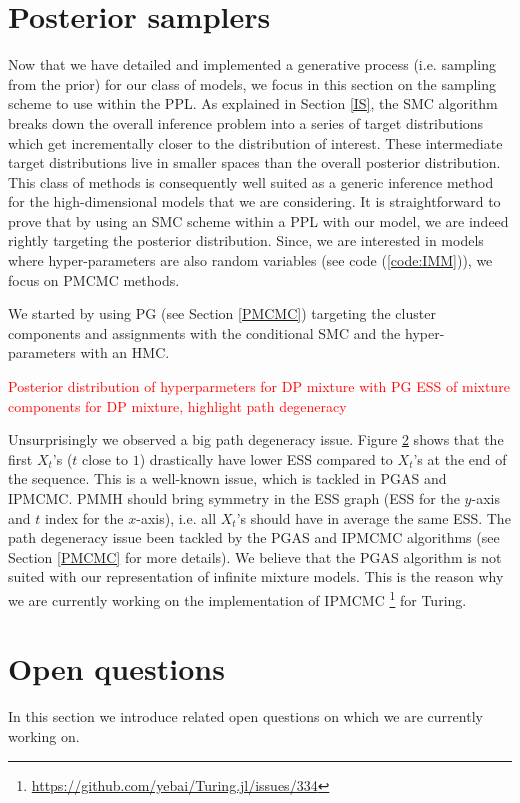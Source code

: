 \section{Posterior samplers}

Now that we have detailed and implemented a generative process (i.e. sampling from the prior) for our class of models, we focus in this section on the sampling scheme to use within the \acrlong{PPL}.
As explained in Section \ref{IS}, the \acrfull{SMC} algorithm breaks down the overall inference problem into a series of target distributions which get incrementally closer to the distribution of interest. These intermediate target distributions live in smaller spaces than the overall posterior distribution. This class of methods is consequently well suited as a generic inference method for the high-dimensional models that we are considering. It is straightforward to prove that by using an \gls{SMC} scheme within a \gls{PPL} with our model, we are indeed rightly targeting the posterior distribution.
Since, we are interested in models where hyper-parameters are also random variables (see code (\ref{code:IMM})), we focus on \acrlong{PMCMC} methods.

We started by using \acrlong{PG} (see Section \ref{PMCMC}) targeting the cluster components and assignments with the conditional \gls{SMC} and the hyper-parameters with an \gls{HMC}.

\textcolor{red}{Posterior distribution of hyperparmeters for DP mixture with PG}
\textcolor{red}{ESS of mixture components for DP mixture, highlight path degeneracy}

Unsurprisingly we observed a big path degeneracy issue. Figure \ref{} shows that the first $X_t$'s ($t$ close to $1$) drastically have lower \gls{ESS} compared to $X_t$'s at the end of the sequence. This is a well-known issue, which is tackled in \gls{PGAS} and \gls{IPMCMC}.
\gls{PMMH} should bring symmetry in the \gls{ESS} graph (\gls{ESS} for the $y$-axis and $t$ index for the $x$-axis), i.e. all $X_t$'s should have in average the same \gls{ESS}.
The path degeneracy issue been tackled by the \gls{PGAS} and \gls{IPMCMC} algorithms (see Section \ref{PMCMC} for more details).
We believe that the \gls{PGAS} algorithm is not suited with our representation of infinite mixture models. This is the reason why we are currently working on the implementation of \gls{IPMCMC} \footnote{\url{https://github.com/yebai/Turing.jl/issues/334}} for Turing.


\section{Open questions}
In this section we introduce related open questions on which we are currently working on.

